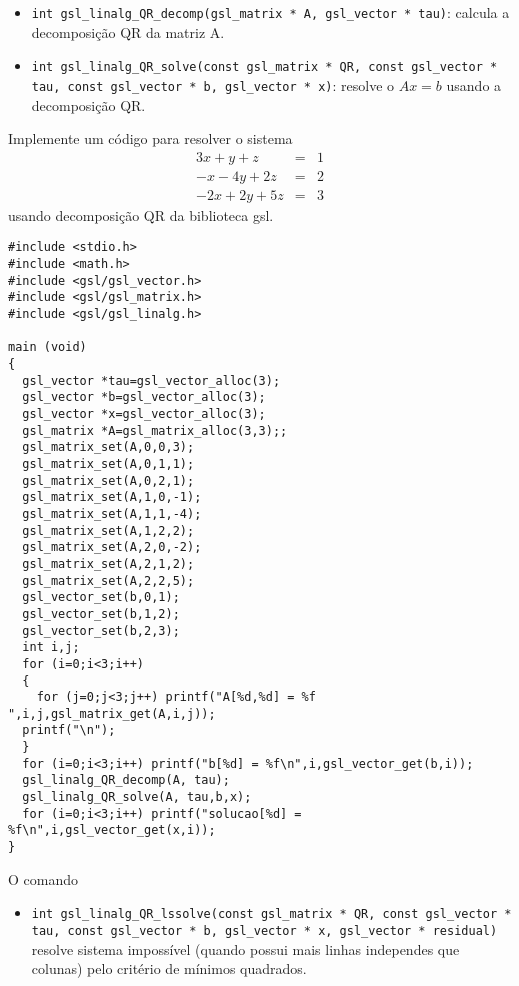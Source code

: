 \begin{itemize}
\item \verb|int gsl_linalg_QR_decomp(gsl_matrix * A, gsl_vector * tau)|: calcula a decomposição QR da matriz A.
 \item \verb|int gsl_linalg_QR_solve(const gsl_matrix * QR, const gsl_vector * tau, const gsl_vector * b, gsl_vector * x)|: resolve o  $A x = b$ usando a decomposição QR.
\end{itemize}
\begin{ex}Implemente um código para resolver o sistema
\begin{eqnarray*}
3x+y+z&=&1\\
-x-4y+2z&=&2\\
-2x+2y+5z&=&3
\end{eqnarray*} 
usando decomposição QR da biblioteca gsl.
\end{ex}

\begin{verbatim}
#include <stdio.h>
#include <math.h>
#include <gsl/gsl_vector.h>
#include <gsl/gsl_matrix.h>
#include <gsl/gsl_linalg.h>

main (void)
{
  gsl_vector *tau=gsl_vector_alloc(3);
  gsl_vector *b=gsl_vector_alloc(3);
  gsl_vector *x=gsl_vector_alloc(3);
  gsl_matrix *A=gsl_matrix_alloc(3,3);;
  gsl_matrix_set(A,0,0,3);
  gsl_matrix_set(A,0,1,1);
  gsl_matrix_set(A,0,2,1);
  gsl_matrix_set(A,1,0,-1);
  gsl_matrix_set(A,1,1,-4);
  gsl_matrix_set(A,1,2,2);
  gsl_matrix_set(A,2,0,-2);
  gsl_matrix_set(A,2,1,2);
  gsl_matrix_set(A,2,2,5);
  gsl_vector_set(b,0,1);
  gsl_vector_set(b,1,2);
  gsl_vector_set(b,2,3);
  int i,j;
  for (i=0;i<3;i++)
  {
    for (j=0;j<3;j++) printf("A[%d,%d] = %f ",i,j,gsl_matrix_get(A,i,j));
  printf("\n");
  }
  for (i=0;i<3;i++) printf("b[%d] = %f\n",i,gsl_vector_get(b,i));
  gsl_linalg_QR_decomp(A, tau);
  gsl_linalg_QR_solve(A, tau,b,x);
  for (i=0;i<3;i++) printf("solucao[%d] = %f\n",i,gsl_vector_get(x,i));
}
\end{verbatim}

O comando
\begin{itemize}
 \item \verb|int gsl_linalg_QR_lssolve(const gsl_matrix * QR, const gsl_vector * tau, const gsl_vector * b, gsl_vector * x, gsl_vector * residual)| resolve sistema impossível (quando possui mais linhas independes que colunas) pelo critério de mínimos quadrados.
\end{itemize}

